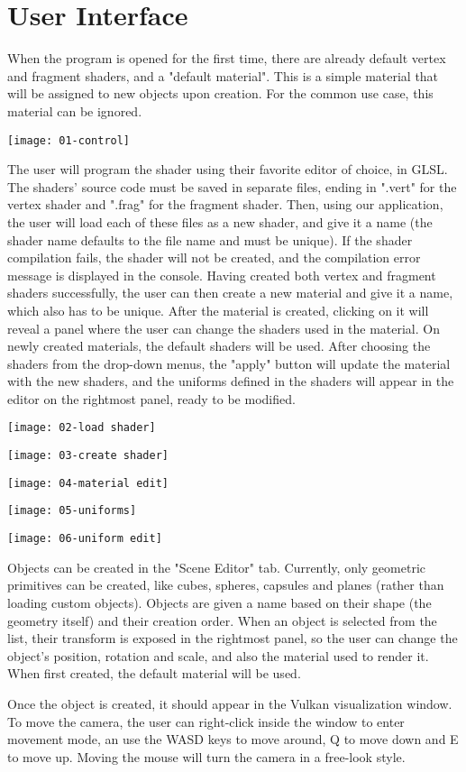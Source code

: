 \section{User Interface}
When the program is opened for the first time, there are already default vertex and fragment shaders, and a "default material". This is a simple material that will be assigned to new objects upon creation. For the common use case, this material can be ignored.

\texttt{[image: 01-control]}

The user will program the shader using their favorite editor of choice, in GLSL. The shaders' source code must be saved in separate files, ending in ".vert" for the vertex shader and ".frag" for the fragment shader. Then, using our application, the user will load each of these files as a new shader, and give it a name (the shader name defaults to the file name and must be unique). If the shader compilation fails, the shader will not be created, and the compilation error message is displayed in the console. Having created both vertex and fragment shaders successfully, the user can then create a new material and give it a name, which also has to be unique. After the material is created, clicking on it will reveal a panel where the user can change the shaders used in the material. On newly created materials, the default shaders will be used. After choosing the shaders from the drop-down menus, the "apply" button will update the material with the new shaders, and the uniforms defined in the shaders will appear in the editor on the rightmost panel, ready to be modified.

\texttt{[image: 02-load shader]}

\texttt{[image: 03-create shader]}

\texttt{[image: 04-material edit]}

\texttt{[image: 05-uniforms]}

\texttt{[image: 06-uniform edit]}

Objects can be created in the "Scene Editor" tab. Currently, only geometric primitives can be created, like cubes, spheres, capsules and planes (rather than loading custom objects). Objects are given a name based on their shape (the geometry itself) and their creation order. When an object is selected from the list, their transform is exposed in the rightmost panel, so the user can change the object's position, rotation and scale, and also the material used to render it. When first created, the default material will be used.


Once the object is created, it should appear in the Vulkan visualization window. To move the camera, the user can right-click inside the window to enter movement mode, an use the WASD keys to move around, Q to move down and E to move up. Moving the mouse will turn the camera in a free-look style.
